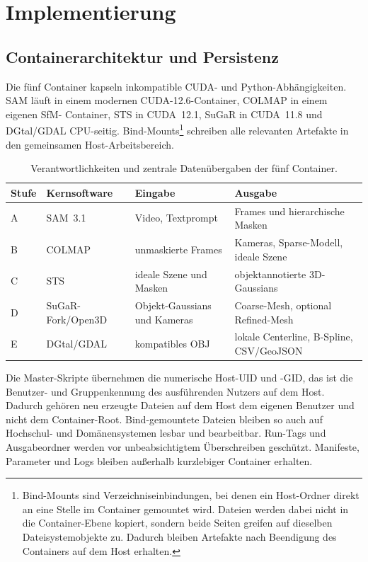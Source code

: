 \section{Implementierung}
\label{sec:implementierung}

\subsection{Containerarchitektur und Persistenz}

Die fünf Container kapseln inkompatible CUDA- und Python-Abhängigkeiten. SAM
läuft in einem modernen CUDA-12.6-Container, COLMAP in einem eigenen SfM-
Container, STS in CUDA~12.1, SuGaR in CUDA~11.8 und DGtal/GDAL CPU-seitig.
Bind-Mounts\footnote{Bind-Mounts sind Verzeichniseinbindungen, bei denen ein
Host-Ordner direkt an eine Stelle im Container gemountet wird. Dateien werden
dabei nicht in die Container-Ebene kopiert, sondern beide Seiten greifen auf
dieselben Dateisystemobjekte zu. Dadurch bleiben Artefakte nach Beendigung
des Containers auf dem Host erhalten.} schreiben alle relevanten Artefakte in
den gemeinsamen Host-Arbeitsbereich.

\begin{table}[H]
\centering
\small
\begin{tabularx}{\textwidth}{p{1.4cm}p{3.4cm}XX}
\toprule
Stufe & Kernsoftware & Eingabe & Ausgabe\\
\midrule
A & SAM~3.1 & Video, Textprompt & Frames und hierarchische Masken\\
B & COLMAP & unmaskierte Frames & Kameras, Sparse-Modell, ideale Szene\\
C & STS & ideale Szene und Masken & objektannotierte 3D-Gaussians\\
D & SuGaR-Fork/Open3D & Objekt-Gaussians und Kameras & Coarse-Mesh,
optional Refined-Mesh\\
E & DGtal/GDAL & kompatibles OBJ & lokale Centerline, B-Spline, CSV/GeoJSON\\
\bottomrule
\end{tabularx}
\caption{Verantwortlichkeiten und zentrale Datenübergaben der fünf Container.}
\label{tab:containerrollen}
\end{table}

Die Master-Skripte übernehmen die numerische Host-UID und -GID, das ist die
Benutzer- und Gruppenkennung des ausführenden Nutzers auf dem Host. Dadurch
gehören neu erzeugte Dateien auf dem Host dem eigenen Benutzer und nicht dem
Container-Root. Bind-gemountete Dateien bleiben so auch auf Hochschul- und
Domänensystemen lesbar und bearbeitbar.
Run-Tags und Ausgabeordner werden vor unbeabsichtigtem Überschreiben geschützt.
Manifeste, Parameter und Logs bleiben außerhalb kurzlebiger Container erhalten.

